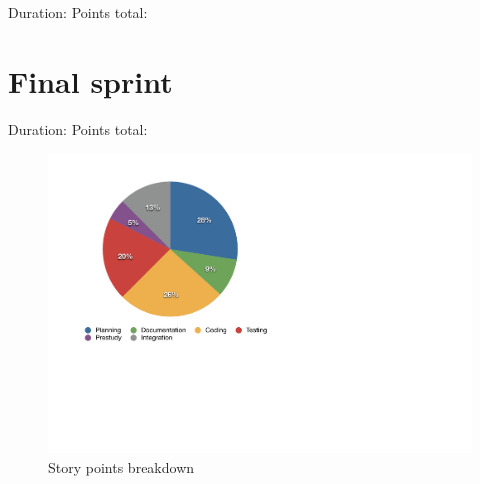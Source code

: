 Duration:
Points total:

\section{Final sprint}

Duration:
Points total:

\begin{figure}[h!]
\centering \includegraphics[scale=0.8]{img/pie_chart.pdf}
\caption{Story points breakdown}
\label{fig:sprints-points}
\end{figure}